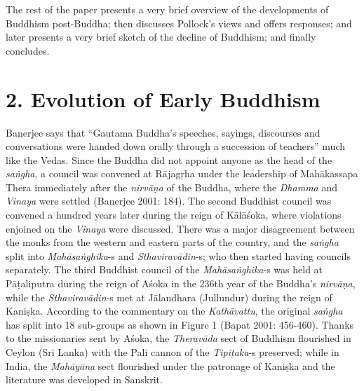 The rest of the paper presents a very brief overview of the developments of Buddhism post-Buddha; then discusses Pollock’s views and offers responses; and later presents a very brief sketch of the decline of Buddhism; and finally concludes.


\section*{2. Evolution of Early Buddhism}

Banerjee says that “Gautama Buddha’s speeches, sayings, discourses and conversations were handed down orally through a succession of teachers” much like the Vedas. Since the Buddha did not appoint anyone as the head of the \textit{saṅgha}, a council was convened at Rājagṛha under the leadership of Mahākassapa Thera immediately after the \textit{nirvāṇa} of the Buddha, where the \textit{Dhamma} and \textit{Vinaya} were settled (Banerjee 2001: 184). The second Buddhist council was convened a hundred years later during the reign of Kālāśoka, where violations enjoined on the \textit{Vinaya} were discussed. There was a major disagreement between the monks from the western and eastern parts of the country, and the \textit{saṅgha} split into \textit{Mahāsaṅghika}-s and \textit{Sthaviravādin}-s; who then started having councils separately. The third Buddhist council of the \textit{Mahāsaṅghika}-s was held at Pāṭaliputra during the reign of Aśoka in the 236th year of the Buddha’s \textit{nirvāṇa}, while the \textit{Sthaviravādin}-s met at Jālandhara (Jullundur) during the reign of Kaniṣka. According to the commentary on the \textit{Kathāvattu}, the original \textit{saṅgha} has split into 18 sub-groups as shown in Figure 1 (Bapat 2001: 456-460). Thanks to the missionaries sent by Aśoka, the \textit{Theravāda} sect of Buddhism flourished in Ceylon (Sri Lanka) with the Pali cannon of the \textit{Tipiṭaka}-s preserved; while in India, the \textit{Mahāyāna} sect flourished under the patronage of Kaniṣka and the literature was developed in Sanskrit.


